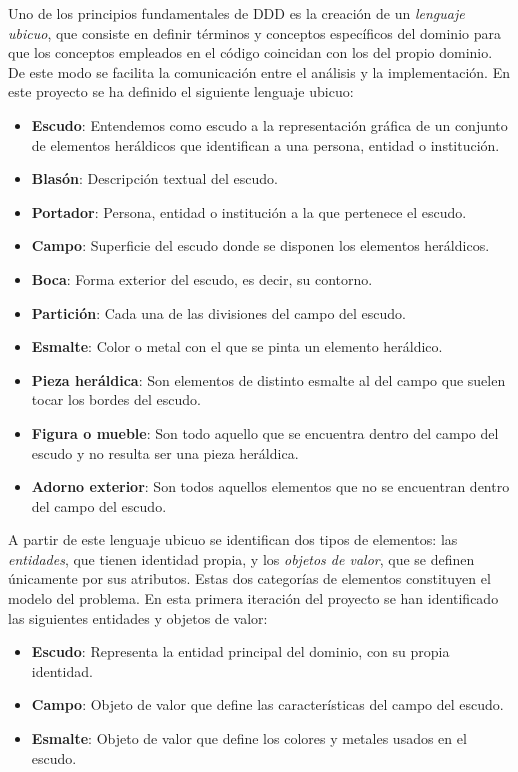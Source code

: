 Uno de los principios fundamentales de DDD es la creación de un \textit{lenguaje ubicuo}, que
consiste en definir términos y conceptos específicos del dominio para que los conceptos empleados en
el código coincidan con los del propio dominio. De este modo se facilita la comunicación entre el 
análisis y la implementación. En este proyecto se ha definido el siguiente lenguaje ubicuo:

\begin{itemize}
    \item \textbf{Escudo}: Entendemos como escudo a la representación gráfica de un conjunto de
    elementos heráldicos que identifican a una persona, entidad o institución.
    \item \textbf{Blasón}: Descripción textual del escudo.
    \item \textbf{Portador}: Persona, entidad o institución a la que pertenece el escudo.
    \item \textbf{Campo}: Superficie del escudo donde se disponen los elementos heráldicos.
    \item \textbf{Boca}: Forma exterior del escudo, es decir, su contorno.
    \item \textbf{Partición}: Cada una de las divisiones del campo del escudo. 
    \item \textbf{Esmalte}: Color o metal con el que se pinta un elemento heráldico.
    \item \textbf{Pieza heráldica}: Son elementos de distinto esmalte al del campo que suelen tocar
    los bordes del escudo.
    \item \textbf{Figura o mueble}: Son todo aquello que se encuentra dentro del campo del escudo y
    no resulta ser una pieza heráldica.
    \item \textbf{Adorno exterior}: Son todos aquellos elementos que no se encuentran dentro del campo
    del escudo.
\end{itemize}

A partir de este lenguaje ubicuo se identifican dos tipos de elementos: las \textit{entidades}, que
tienen identidad propia, y los \textit{objetos de valor}, que se definen únicamente por sus atributos.
Estas dos categorías de elementos constituyen el modelo del problema. En esta primera iteración del
proyecto se han identificado las siguientes entidades y objetos de valor:

\begin{itemize}
    \item \textbf{Escudo}: Representa la entidad principal del dominio, con su propia identidad.
    \item \textbf{Campo}: Objeto de valor que define las características del campo del escudo.
    \item \textbf{Esmalte}: Objeto de valor que define los colores y metales usados en el escudo.
\end{itemize}

